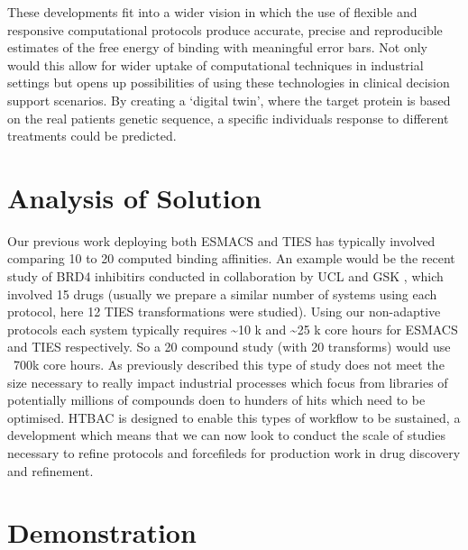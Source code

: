 \documentclass[conference]{IEEEtran}
\begin{document}
These developments fit into a wider vision in which the use of
flexible and responsive computational protocols produce accurate,
precise and reproducible estimates of the free energy of binding with 
meaningful error bars. Not only would this allow for wider uptake of 
computational techniques in industrial settings but opens up possibilities 
of using these technologies in clinical decision support scenarios. By creating 
a `digital twin', where the target protein is based on the real patients 
genetic sequence, a specific individuals response to different 
treatments could be predicted. 


\section{Analysis of Solution}\label{sec:analysis}

Our previous work deploying both ESMACS and TIES has typically involved comparing 10 to 20 computed
binding affinities.
An example would be the recent study of BRD4 inhibitirs conducted in collaboration by UCL and GSK \cite{Wan2017brd4}, which involved 15 drugs (usually we prepare a similar number of systems using each protocol, here 12 TIES transformations were studied).
Using our non-adaptive protocols each system typically requires \textasciitilde 10 k and \textasciitilde 25 k core hours for ESMACS and TIES respectively.
So a 20 compound study (with 20 transforms) would  use ~700k core hours.
As previously described this type of study does not meet the size necessary to really impact industrial processes which focus from libraries of potentially millions of compounds doen to hunders of hits which need to be optimised.
HTBAC is designed to enable this types of workflow to be sustained, a development which means that we can now look to conduct the scale of studies necessary to refine protocols and forcefileds for production work in drug discovery and refinement.



\section{Demonstration}\label{sec:demo}




\end{document}
